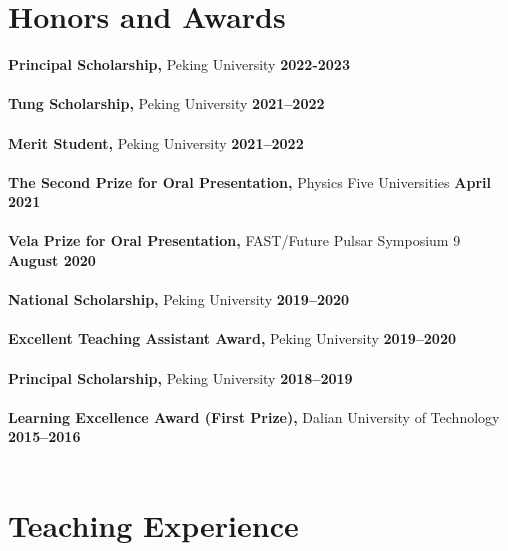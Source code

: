 \documentclass[margin,line]{res}
\begin{document}
\begin{resume}
\section{\sc Honors and Awards}
{\bf Principal Scholarship,} Peking University \hfill {\bf 2022-2023}\\
\\
{\bf Tung Scholarship,} Peking University \hfill {\bf 2021--2022}\\
\\
{\bf Merit Student,} Peking University \hfill {\bf 2021--2022}\\
\\
{\bf The Second Prize for Oral Presentation,} Physics Five Universities \hfill {\bf April 2021}\\
\\
{\bf Vela Prize for Oral Presentation,} FAST/Future Pulsar Symposium 9 \hfill {\bf August 2020}\\
\\
{\bf National Scholarship,} Peking University \hfill {\bf 2019--2020}\\
\\
{\bf Excellent Teaching Assistant Award,} Peking University \hfill {\bf 2019--2020}\\
\\
{\bf Principal Scholarship,} Peking University \hfill {\bf 2018--2019}\\
\\
{\bf Learning Excellence Award (First Prize),} Dalian University of Technology \hfill {\bf 2015--2016}\\
\\

\vspace{-1em}

\section{\sc Teaching Experience}


\end{resume}
\end{document}
